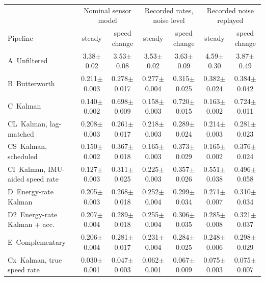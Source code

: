 \begin{tabular}{@{}lcccccc@{}}
\toprule
 & \multicolumn{2}{c}{Nominal sensor model} & \multicolumn{2}{c}{Recorded rates, noise level} & \multicolumn{2}{c}{Recorded noise replayed} \\
Pipeline & steady & speed change & steady & speed change & steady & speed change \\
\midrule
A~Unfiltered & 3.38$\pm$0.02 & 3.53$\pm$0.08 & 3.53$\pm$0.02 & 3.63$\pm$0.09 & 4.59$\pm$0.30 & 3.87$\pm$0.49 \\
B~Butterworth & 0.211$\pm$0.003 & 0.278$\pm$0.017 & 0.277$\pm$0.004 & 0.315$\pm$0.025 & 0.382$\pm$0.024 & 0.384$\pm$0.042 \\
C~Kalman & 0.140$\pm$0.002 & 0.698$\pm$0.009 & 0.158$\pm$0.003 & 0.720$\pm$0.015 & 0.163$\pm$0.002 & 0.724$\pm$0.011 \\
CL~Kalman, lag-matched & 0.208$\pm$0.003 & 0.261$\pm$0.017 & 0.218$\pm$0.003 & 0.289$\pm$0.024 & 0.214$\pm$0.003 & 0.281$\pm$0.023 \\
CS~Kalman, scheduled & 0.150$\pm$0.002 & 0.367$\pm$0.018 & 0.165$\pm$0.003 & 0.373$\pm$0.029 & 0.165$\pm$0.002 & 0.376$\pm$0.024 \\
CI~Kalman, IMU-aided speed rate & 0.127$\pm$0.003 & 0.311$\pm$0.025 & 0.225$\pm$0.003 & 0.357$\pm$0.026 & 0.551$\pm$0.038 & 0.496$\pm$0.058 \\
D~Energy-rate Kalman & 0.205$\pm$0.003 & 0.268$\pm$0.018 & 0.252$\pm$0.004 & 0.299$\pm$0.034 & 0.271$\pm$0.007 & 0.310$\pm$0.034 \\
D2~Energy-rate Kalman + acc. & 0.207$\pm$0.004 & 0.289$\pm$0.018 & 0.255$\pm$0.004 & 0.306$\pm$0.035 & 0.285$\pm$0.008 & 0.321$\pm$0.037 \\
E~Complementary & 0.206$\pm$0.004 & 0.281$\pm$0.017 & 0.231$\pm$0.004 & 0.284$\pm$0.025 & 0.248$\pm$0.006 & 0.298$\pm$0.029 \\
\midrule
Cx~Kalman, true speed rate & 0.030$\pm$0.001 & 0.047$\pm$0.003 & 0.062$\pm$0.001 & 0.067$\pm$0.009 & 0.075$\pm$0.003 & 0.075$\pm$0.007 \\
\bottomrule
\end{tabular}
